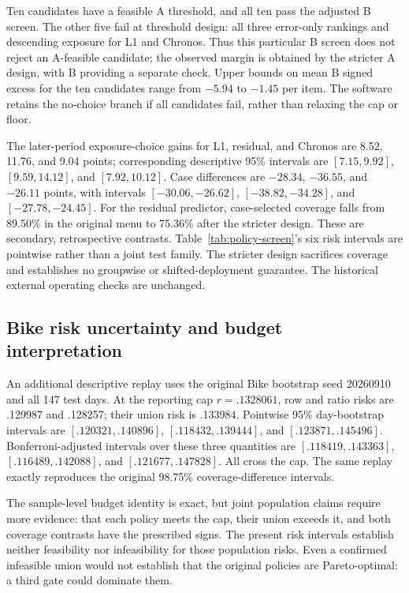 Ten candidates have a feasible A threshold, and all ten pass the adjusted B screen. The other five fail at threshold design: all three error-only rankings and descending exposure for L1 and Chronos. Thus this particular B screen does not reject an A-feasible candidate; the observed margin is obtained by the stricter A design, with B providing a separate check. Upper bounds on mean B signed excess for the ten candidates range from $-5.94$ to $-1.45$ per item. The software retains the no-choice branch if all candidates fail, rather than relaxing the cap or floor.



The later-period exposure-choice gains for L1, residual, and Chronos are 8.52, 11.76, and 9.04 points; corresponding descriptive 95\% intervals are $[7.15,9.92]$, $[9.59,14.12]$, and $[7.92,10.12]$. Case differences are $-28.34$, $-36.55$, and $-26.11$ points, with intervals $[-30.06,-26.62]$, $[-38.82,-34.28]$, and $[-27.78,-24.45]$. For the residual predictor, case-selected coverage falls from 89.50\% in the original menu to 75.36\% after the stricter design. These are secondary, retrospective contrasts. Table~\ref{tab:policy-screen}'s six risk intervals are pointwise rather than a joint test family. The stricter design sacrifices coverage and establishes no groupwise or shifted-deployment guarantee. The historical external operating checks are unchanged.

\subsection{Bike risk uncertainty and budget interpretation}
An additional descriptive replay uses the original Bike bootstrap seed 20260910 and all 147 test days. At the reporting cap $r=.1328061$, row and ratio risks are .129987 and .128257; their union risk is .133984. Pointwise 95\% day-bootstrap intervals are $[.120321,.140896]$, $[.118432,.139444]$, and $[.123871,.145496]$. Bonferroni-adjusted intervals over these three quantities are $[.118419,.143363]$, $[.116489,.142088]$, and $[.121677,.147828]$. All cross the cap. The same replay exactly reproduces the original 98.75\% coverage-difference intervals.

The sample-level budget identity is exact, but joint population claims require more evidence: that each policy meets the cap, their union exceeds it, and both coverage contrasts have the prescribed signs. The present risk intervals establish neither feasibility nor infeasibility for those population risks. Even a confirmed infeasible union would not establish that the original policies are Pareto-optimal: a third gate could dominate them.

